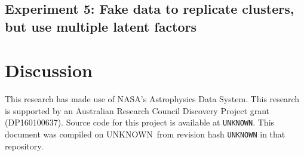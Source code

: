 \documentclass{aastex61}
\newcommand{\gitdate}{UNKNOWN}
\newcommand{\githash}{UNKNOWN}
\newcommand{\giturl}{UNKNOWN}}
\begin{document}
\subsection{Experiment 5: Fake data to replicate clusters, but use multiple latent factors}

\section{Discussion}
\label{sec:discussion}


\acknowledgments

This research has made use of NASA's Astrophysics Data System.
This research is supported by an Australian Research Council Discovery Project
grant (DP160100637). 
Source code for this project is available at \texttt{\giturl}. This document
was compiled on \gitdate\ from revision hash \texttt{\githash} in that
repository. 


\end{document}
